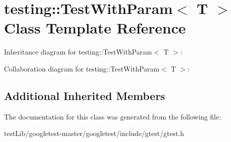 \hypertarget{classtesting_1_1TestWithParam}{}\section{testing\+:\+:Test\+With\+Param$<$ T $>$ Class Template Reference}
\label{classtesting_1_1TestWithParam}


Inheritance diagram for testing\+:\+:Test\+With\+Param$<$ T $>$\+:


Collaboration diagram for testing\+:\+:Test\+With\+Param$<$ T $>$\+:
\subsection*{Additional Inherited Members}


The documentation for this class was generated from the following file\+:\begin{DoxyCompactItemize}
\item 
test\+Lib/googletest-\/master/googletest/include/gtest/gtest.\+h\end{DoxyCompactItemize}
